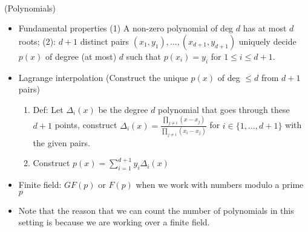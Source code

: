 \documentclass{article}
\begin{document}
\\
(Polynomials)
\begin{itemize}
	\item Fundamental properties (1) A non-zero polynomial of deg $d$ has at most $d$ roots; (2): $d+1$ distinct pairs $(x_1,y_1),\dots,(x_{d+1},y_{d+1})$ uniquely decide $p(x)$ of degree (at most) $d$ such that $p(x_i)=y_i$ for $1\leq i\leq d+1$.
	\item Lagrange interpolation (Construct the unique $p(x)$ of deg $\leq d$ from $d+1$ pairs)
	\begin{enumerate}
		\item Def: Let $\Delta_i(x)$ be the degree $d$ polynomial that goes through these $d+1$ points, construct $\Delta_i(x) = \frac{\prod_{j\neq i} (x-x_j)}{\prod_{j\neq i} (x_i-x_j)}$ for $i\in\{1,\dots,d+1\}$ with the given pairs.
		\item Construct $p(x) = \sum\limits_{i=1}^{d+1} y_i\Delta_i(x)$
	\end{enumerate}
	\item Finite field: $GF(p)$ or $F(p)$ when we work with numbers modulo a prime $p$
	\item Note that the reason that we can count the number of polynomials in this setting is because we are working over a finite field.


\end{itemize}
\end{document}
